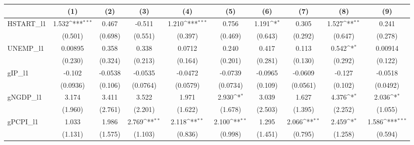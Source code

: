 {
\def\sym#1{\ifmmode^{#1}\else\(^{#1}\)\fi}
\begin{tabular}{l*{9}{c}}
\toprule
                &\multicolumn{1}{c}{(1)}         &\multicolumn{1}{c}{(2)}         &\multicolumn{1}{c}{(3)}         &\multicolumn{1}{c}{(4)}         &\multicolumn{1}{c}{(5)}         &\multicolumn{1}{c}{(6)}         &\multicolumn{1}{c}{(7)}         &\multicolumn{1}{c}{(8)}         &\multicolumn{1}{c}{(9)}         \\
\midrule
HSTART_l1       &    1.532\sym{***}&    0.467         &   -0.511         &    1.210\sym{***}&    0.756         &    1.191\sym{*}  &    0.305         &    1.527\sym{**} &    0.241         \\
                &  (0.501)         &  (0.698)         &  (0.551)         &  (0.397)         &  (0.469)         &  (0.643)         &  (0.292)         &  (0.647)         &  (0.278)         \\
UNEMP_l1        &  0.00895         &    0.358         &    0.338         &   0.0712         &    0.240         &    0.417         &    0.113         &    0.542\sym{*}  &  0.00914         \\
                &  (0.230)         &  (0.324)         &  (0.213)         &  (0.164)         &  (0.201)         &  (0.281)         &  (0.130)         &  (0.292)         &  (0.122)         \\
gIP_l1          &   -0.102         &  -0.0538         &  -0.0535         &  -0.0472         &  -0.0739         &  -0.0965         &  -0.0609         &   -0.127         &  -0.0518         \\
                & (0.0936)         &  (0.106)         & (0.0764)         & (0.0579)         & (0.0734)         &  (0.109)         & (0.0561)         &  (0.102)         & (0.0492)         \\
gNGDP_l1        &    3.174         &    3.411         &    3.522         &    1.971         &    2.930\sym{*}  &    3.039         &    1.627         &    4.376\sym{*}  &    2.036\sym{*}  \\
                &  (1.960)         &  (2.761)         &  (2.201)         &  (1.622)         &  (1.678)         &  (2.503)         &  (1.395)         &  (2.252)         &  (1.055)         \\
gPCPI_l1        &    1.033         &    1.986         &    2.769\sym{**} &    2.118\sym{**} &    2.100\sym{**} &    1.295         &    2.066\sym{**} &    2.459\sym{*}  &    1.586\sym{***}\\
                &  (1.131)         &  (1.575)         &  (1.103)         &  (0.836)         &  (0.998)         &  (1.451)         &  (0.795)         &  (1.258)         &  (0.594)         \\

\end{tabular}}
